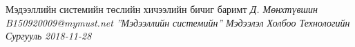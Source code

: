 \thesistitle
	{ Мэдээллийн системийн төслийн хичээлийн бичиг баримт}
	{\emph{Д. Мөнхтүвшин\\B150920009@mymust.net}}
	{\emph{''Мэдээллийн системийн''}}
	{\emph{ Мэдээлэл Холбоо Технологийн Сургууль}}
	{\emph{2018-11-28}}